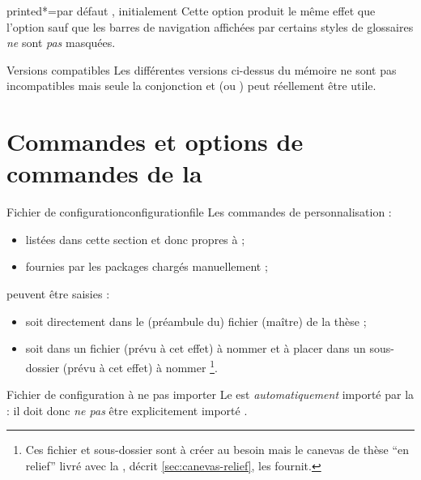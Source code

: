 \begin{docKey}{printed*}{=\textbar{}}{par défaut ,
    initialement }
  Cette option produit le même effet que l'option  sauf que les
  barres de navigation affichées par certains styles de glossaires \emph{ne}
  sont \emph{pas} masquées.
\end{docKey}

\begin{dbremark}{Versions compatibles}{}
  Les différentes versions ci-dessus du mémoire ne sont pas incompatibles mais
  seule la conjonction  et  (ou
  ) peut réellement être utile.
\end{dbremark}

\section{Commandes et options de commandes de la \yatcl}

\begin{dbremark}{Fichier de configuration}{configurationfile}
  Les commandes de personnalisation :
  \begin{itemize}
  \item listées dans cette section et donc propres à \yatcl{} ;
  \item fournies par les packages chargés manuellement ;
  \end{itemize}
  peuvent être saisies :
  \begin{itemize}
  \item soit directement dans le (préambule du) fichier (maître) de
    la thèse ;
  \item soit dans un fichier (prévu à cet effet) à nommer
    \file{\configurationfile} et à placer dans un sous-dossier
    (prévu à cet effet) à nommer
    \directory{\configurationdirectory}\footnote{Ces fichier et
      sous-dossier sont à créer au besoin mais le canevas de thèse
      \enquote{en relief} livré avec la \yatcl, décrit
      \vref{sec:canevas-relief}, les fournit.}.
  \end{itemize}
\end{dbremark}

\begin{dbwarning}{Fichier de configuration à ne pas importer}{}
  Le \File{\configurationfile} est \emph{automatiquement} importé par la
  \yatcl{} : il doit donc \emph{ne pas} être explicitement importé .
\end{dbwarning}

